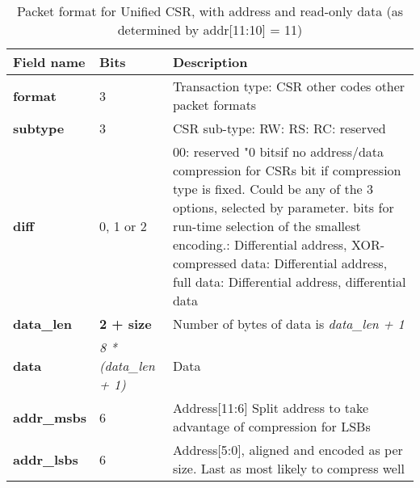 \begin{table}[htp]
  \centering
  \caption{Packet format for Unified CSR, with address and read-only data (as determined by addr[11:10] = 11)}
  \label{tab:te_datadx0y10}
  \begin{tabulary}{\textwidth}{|l|p{40mm}|p{90mm}|}
    \hline
    {\bf Field name} & {\bf Bits} & {\bf Description} \\
    \hline
    \textbf{format} & 	3	& Transaction type: CSR\newline
		other codes other packet formats\\
    \hline
    \textbf{subtype} & 	3	& CSR sub-type: RW: RS: RC: reserved\\	
    \hline
    \textbf{diff} & 0, 1 or 2 & 00: reserved	"0 bitsif no address/data compression for CSRs bit if compression type is fixed. Could be any of the 3 options, selected by parameter. bits for run-time selection of the smallest encoding.:  Differential address, XOR-compressed data: Differential address, full data: Differential address, differential data\\
    \hline
    \textbf{data\_len}	& \textbf{2 + size} & Number of bytes of data is \textit {data\_len + 1}\\
    \hline
    \textbf{data} & \textit {8 * (data\_len + 1)} & Data\\
    \hline
    \textbf{addr\_msbs} & 6  &	Address[11:6]	Split address to take advantage of compression for LSBs\\
    \hline
    \textbf{addr\_lsbs} &  6 & Address[5:0], aligned and encoded as per size. Last as most likely to compress well \\
    \hline
  \end{tabulary}
\end{table}


